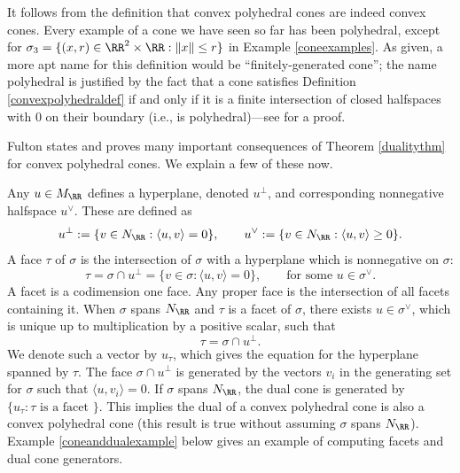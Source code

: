 \documentclass[12pt]{amsart}
\theoremstyle{plain}
\begin{document}
It follows from the definition that convex polyhedral cones are indeed convex cones.
Every example of a cone we have seen so far has been polyhedral, except for $\sigma_3 = \{(x, r) \in \RR^2 \times \RR : \|x\| \le r\}$ in Example \ref{coneexamples}.
As given, a more apt name for this definition would be ``finitely-generated cone'';
the name polyhedral is justified by the fact that a cone satisfies Definition \ref{convexpolyhedraldef} if and only if it is a finite intersection of closed halfspaces with $0$ on their boundary (i.e., is polyhedral)---see \cite[\S 1.3]{DLHK13} for a proof.

Fulton \cite[\S 1.2]{Fulton93} states and proves many important consequences of Theorem \ref{dualitythm} for convex polyhedral cones.
We explain a few of these now.

Any $u \in M_\RR$ defines a hyperplane, denoted $u^\perp$, and corresponding nonnegative halfspace $u^\vee$.
These are defined as
$$u^\perp := \{v \in N_\RR : \langle u, v\rangle = 0\}, \qquad u^\vee := \{v \in N_\RR : \langle u, v\rangle \ge 0\}.$$
A face $\tau$ of $\sigma$ is the intersection of $\sigma$ with a hyperplane which is nonnegative on $\sigma$:
$$\tau = \sigma \cap u^\perp = \{v \in \sigma : \langle u, v \rangle = 0\}, \qquad \text{for some } u \in \sigma^\vee.$$
A facet is a codimension one face. 
Any proper face is the intersection of all facets containing it.
When $\sigma$ spans $N_\RR$ and $\tau$ is a facet of $\sigma$, there exists $u \in \sigma^\vee$, which is unique up to multiplication by a positive scalar, such that
$$\tau = \sigma \cap u^\perp.$$
We denote such a vector by $u_\tau$, which gives the equation for the hyperplane spanned by $\tau$.
The face $\sigma \cap u^\perp$ is generated by the vectors $v_i$ in the generating set for $\sigma$ such that $\langle u, v_i\rangle = 0$.
If $\sigma$ spans $N_\RR$, the dual cone is generated by $\{u_\tau : \tau \text{ is a facet }\}$.
This implies the dual of a convex polyhedral cone is also a convex polyhedral cone (this result is true without assuming $\sigma$ spans $N_\RR$).
Example \ref{coneanddualexample} below gives an example of computing facets and dual cone generators.
\end{document}
